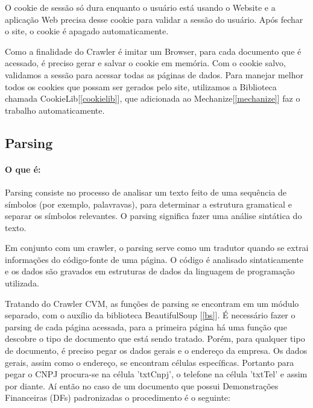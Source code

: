 \documentclass[a4paper, 12pt]{article}
\begin{document}
O cookie de sessão só dura enquanto o usuário está usando
o Website e a aplicação Web precisa desse cookie para validar a
sessão do usuário. Após fechar o site, o cookie é apagado
automaticamente.

Como a finalidade do Crawler é imitar um Browser, para cada documento
que é acessado, é preciso gerar e salvar o cookie em memória. Com o
cookie salvo, validamos a sessão para acessar todas as páginas de
dados. Para manejar melhor todos os cookies que possam ser gerados
pelo site, utilizamos a Biblioteca chamada CookieLib[\ref{cookielib}],
que adicionada ao Mechanize[\ref{mechanize}] faz o trabalho automaticamente.

\subsection{Parsing}
\paragraph{O que é:}Parsing consiste no processo de analisar um texto
feito de uma sequência de símbolos (por exemplo, palavravas), para
determinar a estrutura gramatical e separar os símbolos relevantes. O
parsing significa fazer uma análise sintática do texto. 

Em conjunto com um crawler, o parsing serve como um
tradutor quando se extrai informações do código-fonte de uma
página. O código é analisado sintaticamente e os dados são gravados em
estruturas de dados da linguagem de programação utilizada.

Tratando do Crawler CVM, as funções de parsing se encontram em um
módulo separado, com o auxílio da biblioteca BeautifulSoup [\ref{bs}].
É necessário fazer o parsing de cada página acessada, para a primeira
página há uma função que descobre o tipo de documento que está sendo
tratado. Porém, para qualquer tipo de documento, é preciso pegar os
dados gerais e o endereço da empresa. Os dados gerais, assim como o
endereço, se encontram células específicas. Portanto para pegar o CNPJ
procura-se na célula 'txtCnpj', o telefone na célula 'txtTel' e assim
por diante. Aí então no caso de um documento que possui Demonstrações
Financeiras (DFs) padronizadas o procedimento é o seguinte:
\end{document}
